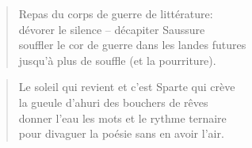   \begin{verse}
    Repas du corps de guerre de littérature:\\
    dévorer le silence -- décapiter Saussure\\
    souffler le cor de guerre dans les landes futures\\
    jusqu’à plus de souffle (et la pourriture).
  \end{verse}
  \begin{verse}
    Le soleil qui revient et c’est Sparte qui crève\\
    la gueule d’ahuri des bouchers de rêves\\
    donner l’eau les mots et le rythme ternaire\\
    pour divaguer la poésie sans en avoir l’air.
  \end{verse}
